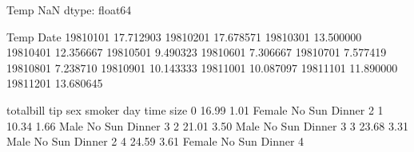 \documentclass[letterpaper,10pt,english]{jupyterBook}
\begin{document}
\begin{sphinxVerbatim}[commandchars=\\\{\}]
Temp   NaN
dtype: float64
\end{sphinxVerbatim}

\begin{sphinxVerbatim}[commandchars=\\\{\}]
\end{sphinxVerbatim}

\begin{sphinxVerbatim}[commandchars=\\\{\}]
                 Temp
Date                 
1981\PYGZhy{}01\PYGZhy{}01  17.712903
1981\PYGZhy{}02\PYGZhy{}01  17.678571
1981\PYGZhy{}03\PYGZhy{}01  13.500000
1981\PYGZhy{}04\PYGZhy{}01  12.356667
1981\PYGZhy{}05\PYGZhy{}01   9.490323
1981\PYGZhy{}06\PYGZhy{}01   7.306667
1981\PYGZhy{}07\PYGZhy{}01   7.577419
1981\PYGZhy{}08\PYGZhy{}01   7.238710
1981\PYGZhy{}09\PYGZhy{}01  10.143333
1981\PYGZhy{}10\PYGZhy{}01  10.087097
1981\PYGZhy{}11\PYGZhy{}01  11.890000
1981\PYGZhy{}12\PYGZhy{}01  13.680645
\end{sphinxVerbatim}

\begin{sphinxVerbatim}[commandchars=\\\{\}]
   
\end{sphinxVerbatim}

\begin{sphinxVerbatim}[commandchars=\\\{\}]
  
\end{sphinxVerbatim}

\begin{sphinxVerbatim}[commandchars=\\\{\}]
   total\PYGZus{}bill   tip     sex smoker  day    time  size
0       16.99  1.01  Female     No  Sun  Dinner     2
1       10.34  1.66    Male     No  Sun  Dinner     3
2       21.01  3.50    Male     No  Sun  Dinner     3
3       23.68  3.31    Male     No  Sun  Dinner     2
4       24.59  3.61  Female     No  Sun  Dinner     4
\end{sphinxVerbatim}
\end{document}

